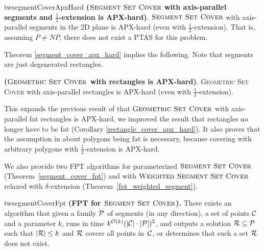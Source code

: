 \begin{restatable}{tw}{segmentCoverApxHard}{
\label{segment_cover_apx_hard}
	\textbf{($\textsc{Segment Set Cover}$ with axis-parallel segments and $\frac{1}{2}$-extension is APX-hard)}.	
	$\textsc{Segment Set Cover}$
	with axis-parallel segments in the 2D plane
	is APX-hard (even with $\frac{1}{2}$-extension).
	That is, assuming $P\neq NP$, there does not exist a PTAS
	for this problem.
}\end{restatable}

Theorem \ref{segment_cover_apx_hard} implies the following.
Note that segments are just degenerated rectangles.

\begin{corollary}{
\label{rectangle_cover_apx_hard}
	\textbf{($\textsc{Geometric Set Cover}$ with rectangles is APX-hard)}.	
	\textsc{Geometric} \textsc{Set} \textsc{Cover}
	with axis-parallel rectangles is APX-hard (even with $\frac{1}{2}$-extension).
}\end{corollary}

This expands the previous result of \cite{rectangles_apx_hard} 
that $\textsc{Geometric Set Cover}$
with axis-parallel fat rectangles is APX-hard,
we improved the result that rectangles no longer
have to be fat (Corollary \ref{rectangle_cover_apx_hard}).
It also proves that the assumption in \cite{harpeled12}
about polygons being fat is necessary, because
covering with arbitrary polygons with $\frac{1}{2}$-extension is APX-hard.

We also provide two FPT algorithms for parameterized $\textsc{Segment Set Cover}$ 	
(Theorem~\ref{segment_cover_fpt})
and with $\textsc{Weighted Segment Set Cover}$ relaxed with $\delta$-extension
(Theorem~\ref{fpt_weighted_segment}).

\begin{restatable}{tw}{segmentCoverFpt}{
	\label{segment_cover_fpt}
	\textbf{(FPT for $\textsc{Segment Set Cover}$).}
	There exists an algorithm that given a family $\mathcal{P}$ of
	segments (in any direction),
	a set of points $\mathcal{C}$
	and a parameter $k$,
	runs in time ${k^{\mathcal{O}(k)} (|\mathcal{C}|\cdot|\mathcal{P}|)^2}$,
	and outputs a solution $\mathcal{R} \subseteq \mathcal{P}$
	such that $|\mathcal{R}| \le k$ and $\mathcal{R}$ covers all points in~$\mathcal{C}$,
	or determines that such a set $\mathcal{R}$ does not exist.
}\end{restatable}

